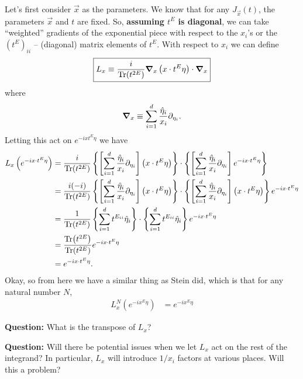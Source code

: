 \documentclass{article}
\theoremstyle{definition}
\newcommand{\p}{\partial}
\newcommand{\f}[2]{\frac{#1}{#2}}
\newcommand{\lp}{\left(}
\newcommand{\rp}{\right)}
\newcommand{\lb}{\left[}
\newcommand{\rb}{\right]}
\newcommand{\lc}{\left\{}
\newcommand{\rc}{\right\}}
\begin{document}
Let's first consider $\vec{x}$ as the parameters. We know that for any $J_{\vec{x}}(t)$, the parameters $\vec{x}$ and $t$ are fixed. So, \textbf{assuming $t^E$ is diagonal}, we can take ``weighted'' gradients of the exponential piece with respect to the $x_i$'s or the $(t^E)_{ii}$ -- (diagonal) matrix elements of $t^E$. With respect to $x_i$ we can define
\begin{align*}
    \boxed{L_x \equiv \f{i}{\Tr (t^{2E})} \grad_x \lp x \cdot t^E \eta \rp \cdot \grad_x}
\end{align*}
where 
\begin{align*}
    \grad_x \equiv \sum^d_{i=1}\f{\hat\eta_i}{x_i}\p_{\eta_i}.
\end{align*}
Letting this act on $e^{-i x t^E \eta}$ we have
\begin{align*}
    L_x \lp e^{-i x\cdot  t^E \eta} \rp &= \f{i}{\Tr(t^{2E})}\lc \lb \sum^d_{i=1}\f{\hat\eta_i }{x_i}\p_{\eta_i}  \rb\lp x \cdot t^E \eta \rp \rc \cdot \lc  \lb \sum^d_{i=1}\f{\hat\eta_i }{x_i}\p_{\eta_i}  \rb e^{-i x \cdot t^E \eta} \rc\\
    &= \f{i(-i)}{\Tr(t^{2E})}\lc \lb \sum^d_{i=1}\f{\hat\eta_i }{x_i}\p_{\eta_i}  \rb\lp x \cdot t^E \eta \rp \rc \cdot \lc \lb \sum^d_{i=1}\f{\hat\eta_i }{x_i}\p_{\eta_i}  \rb\lp x \cdot t^E \eta \rp \rc e^{-i x \cdot t^E \eta}\\
    &= \f{1}{\Tr(t^{2E})} \lc \sum^d_{i=1} t^{E_{ii}} \hat\eta_i \rc \cdot \lc \sum^d_{i=1} t^{E_{ii}} \hat\eta_i \rc e^{-i x \cdot t^E \eta}\\
    &= \f{\Tr (t^{2E})}{ \Tr (t^{2E})} e^{-i x \cdot t^E \eta} \\
    &= e^{-i x \cdot t^E \eta}.
\end{align*}
Okay, so from here we have a similar thing as Stein did, which is that for any natural number $N$,
\begin{align*}
    L_x^N \lp  e^{-i x^E\eta} \rp &= e^{-i x^E\eta}
\end{align*}


\begin{framed}
\noindent \textbf{Question:} What is the transpose of $L_x$?
\end{framed}

\begin{framed}
\noindent \textbf{Question:} Will there be potential issues when we let $L_x$ act on the rest of the integrand? In particular, $L_x$ will introduce $1/x_i$ factors at various places. Will this a problem?
\end{framed}
\end{document}
